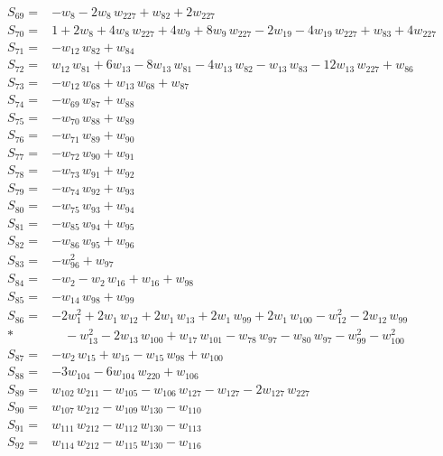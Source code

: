 \documentclass[11pt]{article}
\theoremstyle{remark}\newtheorem{remark}[theorem]{Remark}
\begin{document}
\begin{align*}
S_{69}={}& -w_{8} - 2w_{8}\,w_{227} + w_{82} + 2w_{227} \\[2pt]
S_{70}={}& 1 + 2w_{8} + 4w_{8}\,w_{227} + 4w_{9} + 8w_{9}\,w_{227} - 2w_{19} - 4w_{19}\,w_{227} + w_{83} + 4w_{227} \\[2pt]
S_{71}={}& -w_{12}\,w_{82} + w_{84} \\[2pt]
S_{72}={}& w_{12}\,w_{81} + 6w_{13} - 8w_{13}\,w_{81} - 4w_{13}\,w_{82} - w_{13}\,w_{83} - 12w_{13}\,w_{227} + w_{86} \\[2pt]
S_{73}={}& -w_{12}\,w_{68} + w_{13}\,w_{68} + w_{87} \\[2pt]
S_{74}={}& -w_{69}\,w_{87} + w_{88} \\[2pt]
S_{75}={}& -w_{70}\,w_{88} + w_{89} \\[2pt]
S_{76}={}& -w_{71}\,w_{89} + w_{90} \\[2pt]
S_{77}={}& -w_{72}\,w_{90} + w_{91} \\[2pt]
S_{78}={}& -w_{73}\,w_{91} + w_{92} \\[2pt]
S_{79}={}& -w_{74}\,w_{92} + w_{93} \\[2pt]
S_{80}={}& -w_{75}\,w_{93} + w_{94} \\[2pt]
S_{81}={}& -w_{85}\,w_{94} + w_{95} \\[2pt]
S_{82}={}& -w_{86}\,w_{95} + w_{96} \\[2pt]
S_{83}={}& -w_{96}^{2} + w_{97} \\[2pt]
S_{84}={}& -w_{2} - w_{2}\,w_{16} + w_{16} + w_{98} \\[2pt]
S_{85}={}& -w_{14}\,w_{98} + w_{99} \\[2pt]
S_{86}={}& -2w_{1}^{2} + 2w_{1}\,w_{12} + 2w_{1}\,w_{13} + 2w_{1}\,w_{99} + 2w_{1}\,w_{100} - w_{12}^{2} - 2w_{12}\,w_{99} \\*
&\quad  - w_{13}^{2} - 2w_{13}\,w_{100} + w_{17}\,w_{101} - w_{78}\,w_{97} - w_{80}\,w_{97} - w_{99}^{2} - w_{100}^{2} \\[2pt]
S_{87}={}& -w_{2}\,w_{15} + w_{15} - w_{15}\,w_{98} + w_{100} \\[2pt]
S_{88}={}& -3w_{104} - 6w_{104}\,w_{220} + w_{106} \\[2pt]
S_{89}={}& w_{102}\,w_{211} - w_{105} - w_{106}\,w_{127} - w_{127} - 2w_{127}\,w_{227} \\[2pt]
S_{90}={}& w_{107}\,w_{212} - w_{109}\,w_{130} - w_{110} \\[2pt]
S_{91}={}& w_{111}\,w_{212} - w_{112}\,w_{130} - w_{113} \\[2pt]
S_{92}={}& w_{114}\,w_{212} - w_{115}\,w_{130} - w_{116} \\[2pt]

\end{align*}
\end{document}
